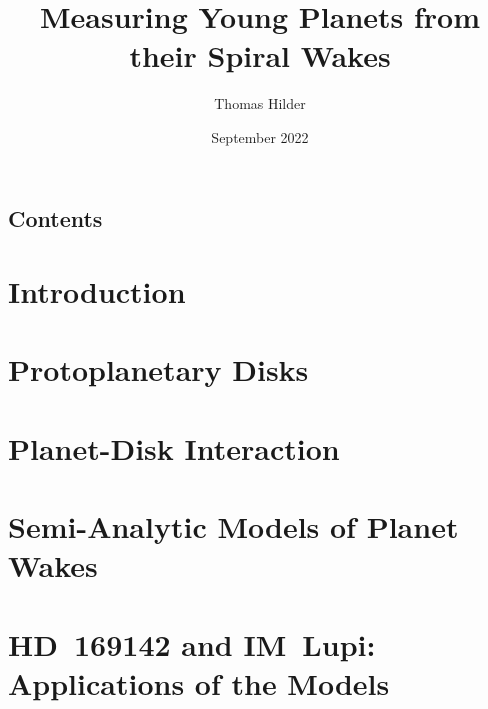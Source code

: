 \documentclass[hidelinks,11pt,a4paper,onecolumn]{report}
\title{Measuring Young Planets from their Spiral Wakes}
\author{Thomas Hilder}
\date{September 2022}
\makeatletter
\def\tableofcontents{\section*{\centering\Large Contents}\@starttoc{toc}}
\makeatother
\begin{document}
    
    

    

    

    

    

    {\hypersetup{hidelinks} \tableofcontents }
    \clearpage

    \setcounter{footnote}{0} 

    \chapter{Introduction}
    
 
    \chapter{Protoplanetary Disks} \label{ch:disks}
    

    \chapter{Planet-Disk Interaction} \label{ch:planetdisk}
    

    \chapter{Semi-Analytic Models of Planet Wakes} \label{ch:wake_models}
    


    \chapter{HD~169142 and IM~Lupi: Applications of the Models} \label{ch:HD169_IMLUP}
    
\end{document}
